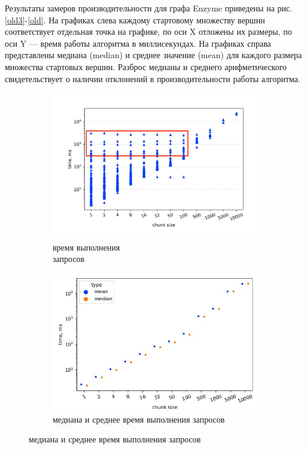 \documentclass[14pt]{matmex-diploma-custom}
\theoremstyle{definition}
\begin{document}
 Результаты замеров производительности для графа Enzyme приведены на рис.\ref{old3}-\ref{old}. На графиках слева каждому стартовому множеству вершин соответствует отдельная точка на графике, по оси X отложены их размеры, по оси Y --- время работы алгоритма в миллисекундах. На графиках справа представлены медиана (median) и среднее значение (mean) для каждого размера множества стартовых вершин. Разброс медианы и среднего арифметического свидетельствует о наличии отклонений в производительности работы алгоритма.
\begin{figure}[H]
    \begin{subfigure}[b]{0.5\textwidth}
    \centering
    \includegraphics[width=\textwidth]{pics/st_old.pdf_1.jpg}  \caption{время выполнения \\ запросов}
    \label{1}
    \end{subfigure}%
    \begin{subfigure}[b]{0.5\textwidth}
    \centering
    \includegraphics[width=\columnwidth]{pics/st_old_mean&median.pdf_1.jpg} \caption{медиана и среднее время выполнения запросов}

\end{subfigure}
\end{figure}
\end{document}

